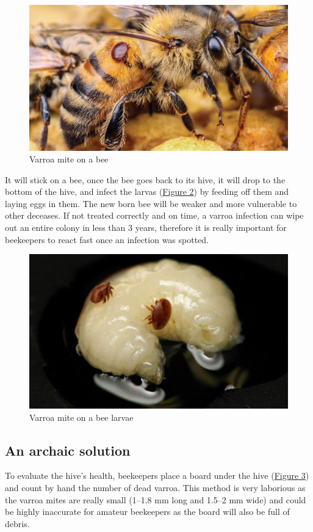 \documentclass{article}
\begin{document}
\begin{figure}[!ht]
  \centering
  \includegraphics[scale = 0.20]{Bees/varroa.jpg}
  \caption{Varroa mite on a bee}
  \label{Figure 1}
\end{figure}

It will stick on a bee, once the bee goes back to its hive, it will drop to the bottom of the hive, and infect the larvas (\hyperref[Figure 2]{Figure 2}) by feeding off them and laying eggs in them. The  new born bee will be weaker and more vulnerable to other deceases. If not treated correctly and on time, a varroa infection can wipe out an entire colony in less than 3 years, therefore it is really important for beekeepers to react fast once an infection was spotted. 

\begin{figure}[!ht]
  \centering
  \includegraphics[scale = 0.5]{Bees/larvae.jpg}
  \caption{Varroa mite on a bee larvae}
  \label{Figure 2}
\end{figure}


\subsection{An archaic solution}
To evaluate the hive's health, beekeepers place a board under the hive (\hyperref[Figure 3]{Figure 3}) and count by hand the number of dead varroa. This method is very laborious as the varroa mites are really small (1–1.8 mm long and 1.5–2 mm wide) and could be highly inaccurate for amateur beekeepers as the board will also be full of debris. 
\end{document}
